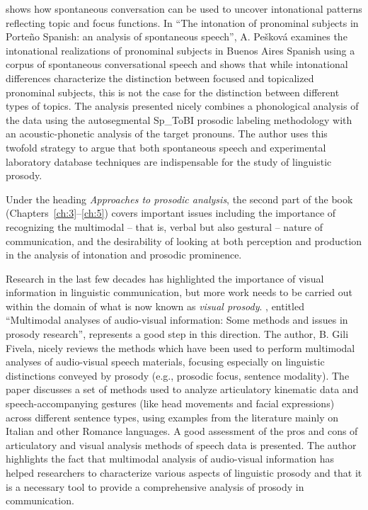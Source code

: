 \documentclass[output=paper]{langsci/langscibook}
\begin{document}
\textbf{} shows how spontaneous conversation can be used to uncover intonational patterns reflecting topic and focus functions. In ``The intonation of pronominal subjects in Porteño Spanish: an analysis of spontaneous speech”, A. Pešková examines the intonational realizations of pronominal subjects in Buenos Aires Spanish using a corpus of spontaneous conversational speech and shows that while intonational differences characterize the distinction between focused and topicalized pronominal subjects, this is not the case for the distinction between different types of topics. The analysis presented nicely combines a phonological analysis of the data using the autosegmental Sp\_ToBI prosodic labeling methodology with an acoustic-phonetic analysis of the target pronouns. The author uses this twofold strategy to argue that both spontaneous speech and experimental laboratory database techniques are indispensable for the study of linguistic prosody.

Under the heading \textit{Approaches to prosodic analysis}, the second part of the book (Chapters~\ref{ch:3}--\ref{ch:5}) covers important issues including the importance of recognizing the multimodal – that is, verbal but also gestural – nature of communication, and the desirability of looking at both perception and production in the analysis of intonation and prosodic prominence. 

Research in the last few decades has highlighted the importance of visual information in linguistic communication, but more work needs to be carried out within the domain of what is now known as \textit{visual prosody}. \textbf{}, entitled ``Multimodal analyses of audio-visual information: Some methods and issues in prosody research”, represents a good step in this direction. The author, B. Gili Fivela, nicely reviews the methods which have been used to perform multimodal analyses of audio-visual speech materials, focusing especially on linguistic distinctions conveyed by prosody (e.g., prosodic focus, sentence modality). The paper discusses a set of methods used to analyze articulatory kinematic data and speech-accompanying gestures (like head movements and facial expressions) across different sentence types, using examples from the literature mainly on Italian and other Romance languages. A good assessment of the pros and cons of articulatory and visual analysis methods of speech data is presented. The author highlights the fact that multimodal analysis of audio-visual information has helped researchers to characterize various aspects of linguistic prosody and that it is a necessary tool to provide a comprehensive analysis of prosody in communication. 
\end{document}
